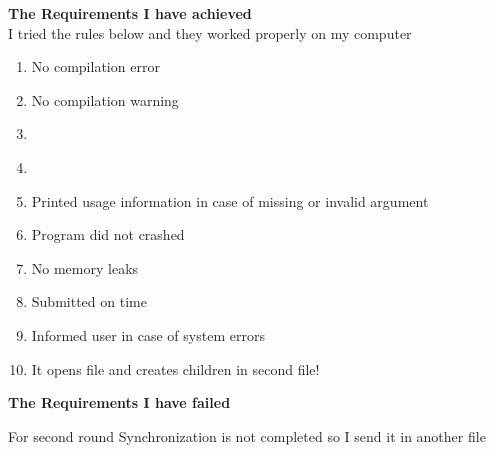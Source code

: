 \documentclass{report}
\begin{document}
{\huge \textbf{The Requirements I have achieved} \\}
 {\large I tried the rules below and they worked properly on my computer}
\begin{enumerate}
    \item {\large No compilation error }
    \item {\large No compilation warning}
    \item {\large {} }
    \item {\large {}}
    \item {\large Printed usage information in case of missing or invalid argument}
    \item {\large Program did not crashed}
    \item {\large No memory leaks}
    \item {\large Submitted on time}
    \item {\large Informed user in case of system errors}
    \item {\large It opens file and creates children in second file!}
    
\end{enumerate}

{\huge \textbf{The Requirements I have failed} \\}

{\large  For second round Synchronization is not completed so I send it in another file \\}
\end{document}
